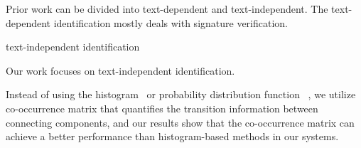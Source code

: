 


	



	
  Prior work can be divided into text-dependent and text-independent. The text-dependent identification mostly deals with signature verification. 

  
  
  
  text-independent identification 
  
  
  Our work focuses on text-independent identification. 
  

  
  
Instead of using the histogram~\cite{Wen201245,writer-identification-musical-scores} or probability distribution function~\cite{Bangla2011,bulacu2007text,schomaker2004automatic} , we utilize co-occurrence matrix that quantifies the transition information between connecting components, and our results show that the co-occurrence matrix can achieve a better performance than histogram-based methods in our systems. 



